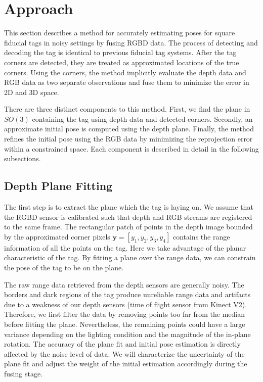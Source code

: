 \section{Approach}
\label{sec:approach}
This section describes a method for accurately estimating poses for square fiducial tags in noisy settings by fusing RGBD data. The process of detecting and decoding the tag is identical to previous fiducial tag systems. After the tag corners are detected, they are treated as approximated locations of the true corners. Using the corners, the method implicitly evaluate the depth data and RGB data as two separate observations and fuse them to minimize the error in 2D and 3D space.

There are three distinct components to this method. First, we find the plane in $SO(3)$ containing the tag using depth data and detected corners. Secondly, an approximate initial pose is computed using the depth plane. Finally, the method refines the initial pose using the RGB data by minimizing the reprojection error within a constrained space. Each component is described in detail in the following subsections. 

\subsection{Depth Plane Fitting}
The first step is to extract the plane which the tag is laying on. We assume that the RGBD sensor is calibrated such that depth and RGB streams are registered to the same frame. The rectangular patch of points in the depth image bounded by the approximated corner pixels $\boldsymbol{y} = [y_1, y_2, y_3, y_4]$ contains the range information of all the points on the tag. Here we take advantage of the planar characteristic of the tag. By fitting a plane over the range data, we can constrain the pose of the tag to be on the plane.

The raw range data retrieved from the depth sensors are generally noisy. The borders and dark regions of the tag produce unreliable range data and artifacts due to a weakness of our depth sensors (time of flight sensor from Kinect V2). Therefore, we first filter the data by removing points too far from the median before fitting the plane. Nevertheless, the remaining points could have a large variance depending on the lighting condition and the magnitude of the in-plane rotation. The accuracy of the plane fit and initial pose estimation is directly affected by the noise level of data. We will characterize the uncertainty of the plane fit and adjust the weight of the initial estimation accordingly during the fusing stage.

